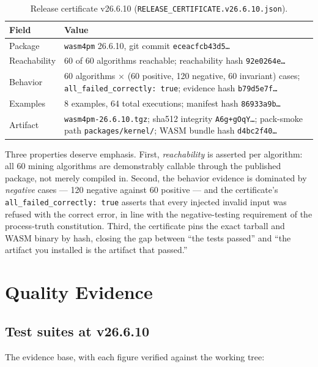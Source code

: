 \documentclass[11pt,oneside]{report}
\newcommand{\projver}{v26.6.10}
\begin{document}
\begin{table}[ht]
\centering
\caption{Release certificate \projver{}
(\texttt{RELEASE\_CERTIFICATE.v26.6.10.json}).}
\label{tab:cert}
\begin{tabular}{lp{8.6cm}}
\toprule
Field & Value \\
\midrule
Package & \texttt{wasm4pm} 26.6.10, git commit \texttt{eceacfcb43d5\ldots} \\
Reachability & 60 of 60 algorithms reachable; reachability hash \texttt{92e0264e\ldots} \\
Behavior & 60 algorithms $\times$ (60 positive, 120 negative, 60 invariant) cases; \texttt{all\_failed\_correctly: true}; evidence hash \texttt{b79d5e7f\ldots} \\
Examples & 8 examples, 64 total executions; manifest hash \texttt{86933a9b\ldots} \\
Artifact & \texttt{wasm4pm-26.6.10.tgz}; sha512 integrity \texttt{A6g+gOqY\ldots}; pack-smoke path \texttt{packages/kernel/}; WASM bundle hash \texttt{d4bc2f40\ldots} \\
\bottomrule
\end{tabular}
\end{table}

Three properties deserve emphasis. First, \emph{reachability} is asserted
per algorithm: all 60 mining algorithms are demonstrably callable through
the published package, not merely compiled in. Second, the behavior
evidence is dominated by \emph{negative} cases --- 120 negative against 60
positive --- and the certificate's \texttt{all\_failed\_correctly: true}
asserts that every injected invalid input was refused with the correct
error, in line with the negative-testing requirement of the process-truth
constitution. Third, the certificate pins the exact tarball and WASM
binary by hash, closing the gap between ``the tests passed'' and ``the
artifact you installed is the artifact that passed.''

\chapter{Quality Evidence}
\label{ch:quality}

\section{Test suites at \projver{}}

The evidence base, with each figure verified against the working tree:
\end{document}
